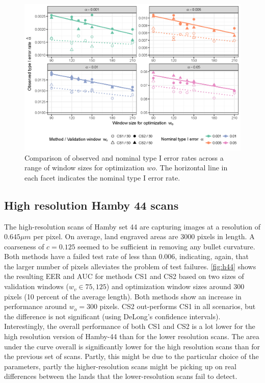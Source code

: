 \documentclass[12pt]{article}
\begin{document}
\begin{figure}

{\centering \includegraphics[width=\textwidth]{figures/type1-1} 

}

\caption{Comparison of observed and nominal type I error rates  across a range of window sizes for optimization $wo$. The horizontal line in each facet indicates the nominal type I error rate.}\label{fig:type1}
\end{figure}

\subsection{High resolution Hamby 44
scans}\label{high-resolution-hamby-44-scans}

The high-resolution scans of Hamby set 44 are capturing images at a
resolution of \(0.645 \mu m\) per pixel. On average, land engraved areas
are 3000 pixels in length. A coarseness of \(c = 0.125\) seemed to be
sufficient in removing any bullet curvature. Both methods have a failed
test rate of less than 0.006, indicating, again, that the larger number
of pixels alleviates the problem of test failures. \autoref{fig:h44}
shows the resulting EER and AUC for methods CS1 and CS2 based on two
sizes of validation windows (\(w_v \in 75, 125\)) and optimization
window sizes around 300 pixels (10 percent of the average length). Both
methods show an increase in performance around \(w_o = 300\) pixels. CS2
out-performs CS1 in all scenarios, but the difference is not significant
(using DeLong's confidence intervals). Interestingly, the overall
performance of both CS1 and CS2 is a lot lower for the high resolution
version of Hamby-44 than for the lower resolution scans. The area under
the curve overall is significantly lower for the high resolution scans
than for the previous set of scans. Partly, this might be due to the
particular choice of the parameters, partly the higher-resolution scans
might be picking up on real differences between the lands that the
lower-resolution scans fail to detect.
\end{document}
